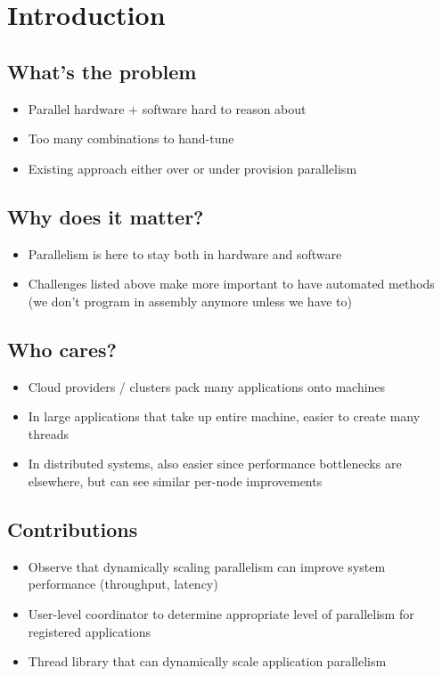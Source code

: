 \section{Introduction}
\subsection*{What's the problem}
\begin{itemize}
  \item Parallel hardware + software hard to reason about
  \item Too many combinations to hand-tune
  \item Existing approach either over or under provision parallelism
\end{itemize}
\subsection*{Why does it matter?}
\begin{itemize}
  \item Parallelism is here to stay both in hardware and software
  \item Challenges listed above make more important to have automated methods (we don't program in assembly anymore unless we have to)
\end{itemize}
\subsection*{Who cares?}
\begin{itemize}
  \item Cloud providers / clusters pack many applications onto machines
  \item In large applications that take up entire machine, easier to create many threads
  \item In distributed systems, also easier since performance bottlenecks are elsewhere, but can see similar per-node improvements
\end{itemize}
\subsection*{Contributions}
\begin{itemize}
  \item Observe that dynamically scaling parallelism can improve system performance (throughput, latency)
  \item User-level coordinator to determine appropriate level of parallelism for registered applications
  \item Thread library that can dynamically scale application parallelism
\end{itemize}
